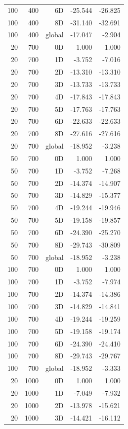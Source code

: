 \begin{longtable}{rrrrr}
100 & 400 & 6D & -25.544 & -26.825 \\
100 & 400 & 8D & -31.140 & -32.691 \\
100 & 400 & global & -17.047 & -2.904 \\
20 & 700 & 0D & 1.000 & 1.000 \\
20 & 700 & 1D & -3.752 & -7.016 \\
20 & 700 & 2D & -13.310 & -13.310 \\
20 & 700 & 3D & -13.733 & -13.733 \\
20 & 700 & 4D & -17.843 & -17.843 \\
20 & 700 & 5D & -17.763 & -17.763 \\
20 & 700 & 6D & -22.633 & -22.633 \\
20 & 700 & 8D & -27.616 & -27.616 \\
20 & 700 & global & -18.952 & -3.238 \\
50 & 700 & 0D & 1.000 & 1.000 \\
50 & 700 & 1D & -3.752 & -7.268 \\
50 & 700 & 2D & -14.374 & -14.907 \\
50 & 700 & 3D & -14.829 & -15.377 \\
50 & 700 & 4D & -19.244 & -19.946 \\
50 & 700 & 5D & -19.158 & -19.857 \\
50 & 700 & 6D & -24.390 & -25.270 \\
50 & 700 & 8D & -29.743 & -30.809 \\
50 & 700 & global & -18.952 & -3.238 \\
100 & 700 & 0D & 1.000 & 1.000 \\
100 & 700 & 1D & -3.752 & -7.974 \\
100 & 700 & 2D & -14.374 & -14.386 \\
100 & 700 & 3D & -14.829 & -14.841 \\
100 & 700 & 4D & -19.244 & -19.259 \\
100 & 700 & 5D & -19.158 & -19.174 \\
100 & 700 & 6D & -24.390 & -24.410 \\
100 & 700 & 8D & -29.743 & -29.767 \\
100 & 700 & global & -18.952 & -3.333 \\
20 & 1000 & 0D & 1.000 & 1.000 \\
20 & 1000 & 1D & -7.049 & -7.932 \\
20 & 1000 & 2D & -13.978 & -15.621 \\
20 & 1000 & 3D & -14.421 & -16.112 \\

\end{longtable}
